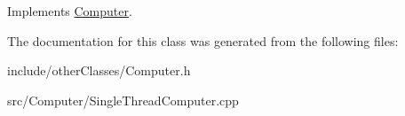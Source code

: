 Implements \hyperlink{classComputer_ad2b5a813419e9152c4a1e22d9531b636}{Computer}.



The documentation for this class was generated from the following files\+:\begin{DoxyCompactItemize}
\item 
include/other\+Classes/Computer.\+h\item 
src/\+Computer/Single\+Thread\+Computer.\+cpp\end{DoxyCompactItemize}

